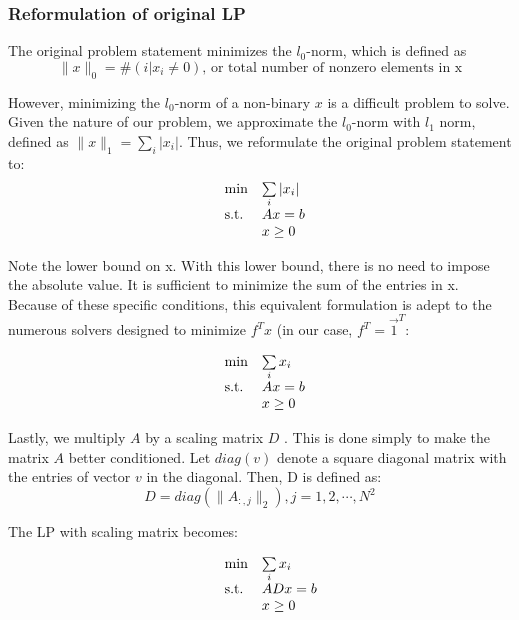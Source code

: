 \documentclass[a4paper]{article}
\begin{document}
\subsubsection*{Reformulation of original LP}

The original problem statement minimizes the $l_0$-norm, which is defined as
\[
\|x\|_0 = \#(i|x_i \neq 0) \text{, or total number of nonzero elements in x}
\]

However, minimizing the $l_0$-norm of a non-binary $x$ is a difficult problem to solve. Given the nature of our problem, we approximate the $l_0$-norm with $l_1$ norm, defined as $\|x\|_1 = \sum\limits_{i} |x_i|$. Thus, we reformulate the original problem statement to:\\

\begin{equation}
\centering
  \begin{array}{ll@{}r@{}r@{}l}
    \text{min} & \sum\limits_{i} |x_i| \\[\jot]
    \text{s.t.}& Ax = b \\
    & \multicolumn{4}{l}{x \geq 0}
  \end{array}
\end{equation}

Note the lower bound on x. With this lower bound, there is no need to impose the absolute value. It is sufficient to minimize the sum of the entries in x. Because of these specific conditions, this equivalent formulation is adept to the numerous solvers designed to minimize $f^{T}x$ (in our case, $f^{T} = \vec{1}^{T}$:

\begin{equation}
\centering
  \begin{array}{ll@{}r@{}r@{}l}
    \text{min} & \sum\limits_{i} x_i \\[\jot]
    \text{s.t.}& Ax = b \\
    & \multicolumn{4}{l}{x \geq 0}
  \end{array}
\end{equation}

Lastly, we multiply $A$ by a scaling matrix $D$ \cite{Liu}. This is done simply to make the matrix $A$ better conditioned. Let $diag(v)$ denote a square diagonal matrix with the entries of vector $v$ in the diagonal. Then, D is defined as:
\[
D = diag(\|A_{:,j}\|_2), j = 1,2, \cdots, N^2 
\]

The LP with scaling matrix becomes: 

\begin{equation}
\centering
  \begin{array}{ll@{}r@{}r@{}l}
    \text{min} & \sum\limits_{i} x_i \\[\jot]
    \text{s.t.}& ADx = b \\
    & \multicolumn{4}{l}{x \geq 0}
  \end{array}
\end{equation}
\end{document}
